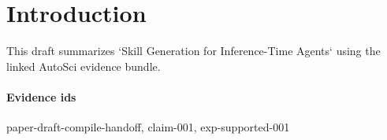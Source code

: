 \section{Introduction}
This draft summarizes `Skill Generation for Inference-Time Agents` using the linked AutoSci evidence bundle.

\paragraph{Evidence ids} paper-draft-compile-handoff, claim-001, exp-supported-001
